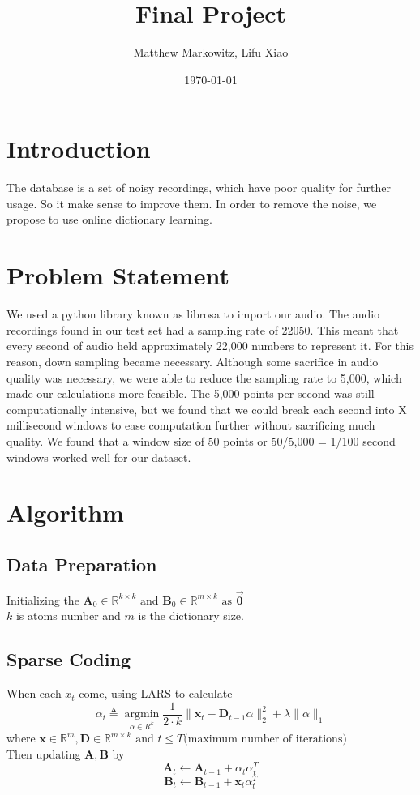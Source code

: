 \documentclass[UTF8]{article}
\title{Final Project}
\author{Matthew Markowitz, Lifu Xiao}
\date{\today}
\begin{document}
\maketitle


\section{Introduction}
The database is a set of noisy recordings, which have poor quality for further usage. So it make sense  to improve them. In order to remove the noise, we propose to use online dictionary learning.



\section{Problem Statement}
We used a python library known as librosa to import our audio\cite{valentini2016speech}. The audio recordings found in our test set had a sampling rate of 22050. This meant that every second of audio held approximately 22,000 numbers to represent it. For this reason, down sampling became necessary. Although some sacrifice in audio quality was necessary, we were able to reduce the sampling rate to 5,000, which made our calculations more feasible. The 5,000 points per second was still computationally intensive, but we found that we could break each second into X millisecond windows to ease computation further without sacrificing much quality. We found that a window size of 50 points or 50/5,000 = 1/100 second windows worked well for our dataset.



\section{Algorithm}

\subsection{Data Preparation}

Initializing the $\bm{A}_0 \in \mathbb{R}^{k \times k} \text{ and } \bm{B}_0 \in \mathbb{R}^{m \times k} \text{ as } \vec{\bm{0}} $\\
$k$ is atoms number and $m$ is the dictionary size.

\subsection{Sparse Coding}
When each $x_t$ come, using LARS\cite{scikit-learn} to calculate
\[
	\alpha_t \triangleq \mathop{\arg\min}\limits_{\alpha\in R^k} \frac{1}{2 \cdot k} \| \bm{x}_t - \bm{D}_{t-1} \alpha  \|^2_2 + \lambda \|\alpha\|_1
\]
where $\bm{x} \in \mathbb{R}^{m}, \bm{D} \in \mathbb{R}^{m \times k} \text{ and } t \leq T \text{(maximum number of iterations)}$
\\
Then updating $\bm{A}, \bm{B}$ by
\[\bm{A}_t \leftarrow \bm{A}_{t-1} + \alpha_t \alpha_t^T\]
\[\bm{B}_t \leftarrow \bm{B}_{t-1} + \bm{x}_t \alpha_t^T\]
\end{document}

